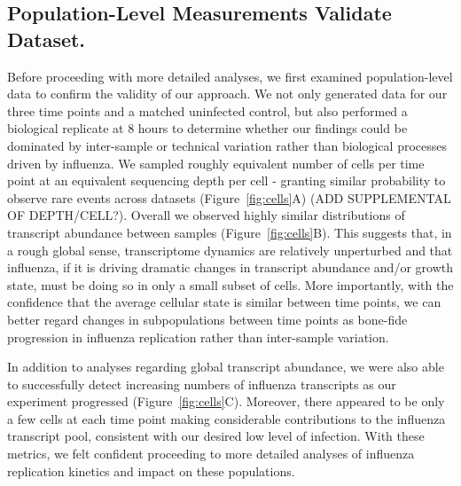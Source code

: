 \documentclass[9pt,lineno]{elife}
\begin{document}
\subsection{Population-Level Measurements Validate Dataset.}
Before proceeding with more detailed analyses, we first examined population-level data to confirm the validity of our approach. We not only generated data for our three time points and a matched uninfected control, but also performed a biological replicate at 8 hours to determine whether our findings could be dominated by inter-sample or technical variation rather than biological processes driven by influenza. We sampled roughly equivalent number of cells per time point at an equivalent sequencing depth per cell - granting similar probability to observe rare events across datasets (Figure~\ref{fig:cells}A) (ADD SUPPLEMENTAL OF DEPTH/CELL?). Overall we observed highly similar distributions of transcript abundance between samples (Figure~\ref{fig:cells}B). This suggests that, in a rough global sense, transcriptome dynamics are relatively unperturbed and that influenza, if it is driving dramatic changes in transcript abundance and/or growth state, must be doing so in only a small subset of cells. More importantly, with the confidence that the average cellular state is similar between time points, we can better regard changes in subpopulations between time points as bone-fide progression in influenza replication rather than inter-sample variation.

In addition to analyses regarding global transcript abundance, we were also able to successfully detect increasing numbers of influenza transcripts as our experiment progressed (Figure~\ref{fig:cells}C). Moreover, there appeared to be only a few cells at each time point making considerable contributions to the influenza transcript pool, consistent with our desired low level of infection. With these metrics, we felt confident proceeding to more detailed analyses of influenza replication kinetics and impact on these populations.
\end{document}
